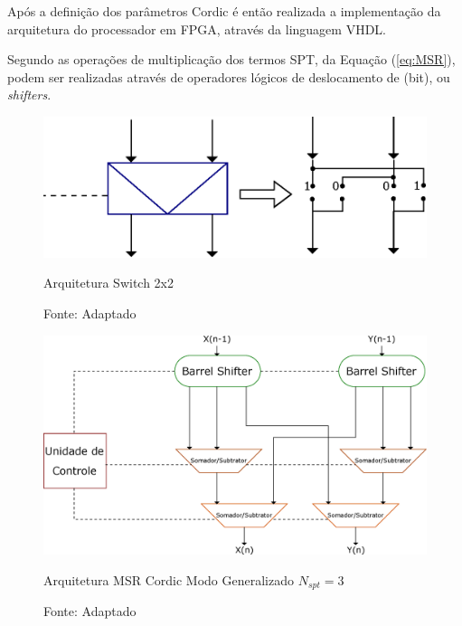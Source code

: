 Após a definição dos parâmetros Cordic é então realizada a implementação da arquitetura do processador em FPGA, através da linguagem VHDL.

Segundo  as operações de multiplicação dos termos SPT, da Equação (\ref{eq:MSR}), podem ser realizadas através de operadores lógicos de deslocamento de \texit(bit), ou  \textit{shifters}. 

 
\vspace{5mm}
\begin{figure}[H]
	\centering
	\captionsetup{width=0.9\textwidth, font=footnotesize, textfont=bf}	
	\includegraphics[width=0.3\linewidth]{Images/ImplementandoCordic/Sswitch.eps}
	\caption{Arquitetura Switch 2x2}
	\vspace{-3.5mm}
	\caption*{Fonte: Adaptado \cite{Chih}}
	\label{fig:Sswitch}
\end{figure}    
\vspace{5mm}

\vspace{5mm}
\begin{figure}[H]
	\centering
	\captionsetup{width=0.9\textwidth, font=footnotesize, textfont=bf}	
	\includegraphics[width=0.9\linewidth]{Images/ImplementandoCordic/ArquiteturaCordicNormal.eps}
	\caption{Arquitetura MSR Cordic Modo Generalizado $N_{spt}=3$}
	\vspace{-3.5mm}
	\caption*{Fonte: Adaptado \cite{Chih}}
	\label{fig:ArquiteturaCordicNormal}
\end{figure}    
\vspace{5mm}


